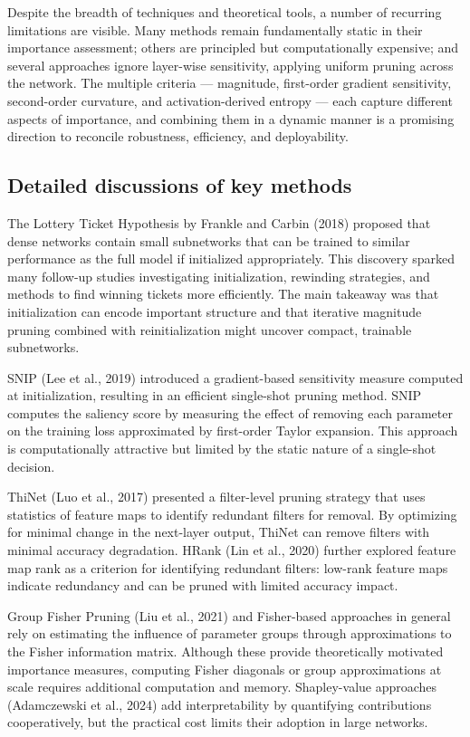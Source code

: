 \documentclass[12pt,a4paper]{report}
\begin{document}
Despite the breadth of techniques and theoretical tools, a number of recurring limitations are visible. Many methods remain fundamentally static in their importance assessment; others are principled but computationally expensive; and several approaches ignore layer-wise sensitivity, applying uniform pruning across the network. The multiple criteria — magnitude, first-order gradient sensitivity, second-order curvature, and activation-derived entropy — each capture different aspects of importance, and combining them in a dynamic manner is a promising direction to reconcile robustness, efficiency, and deployability.

\subsection{Detailed discussions of key methods}
The Lottery Ticket Hypothesis by Frankle and Carbin (2018) proposed that dense networks contain small subnetworks that can be trained to similar performance as the full model if initialized appropriately. This discovery sparked many follow-up studies investigating initialization, rewinding strategies, and methods to find winning tickets more efficiently. The main takeaway was that initialization can encode important structure and that iterative magnitude pruning combined with reinitialization might uncover compact, trainable subnetworks.

SNIP (Lee et al., 2019) introduced a gradient-based sensitivity measure computed at initialization, resulting in an efficient single-shot pruning method. SNIP computes the saliency score by measuring the effect of removing each parameter on the training loss approximated by first-order Taylor expansion. This approach is computationally attractive but limited by the static nature of a single-shot decision.

ThiNet (Luo et al., 2017) presented a filter-level pruning strategy that uses statistics of feature maps to identify redundant filters for removal. By optimizing for minimal change in the next-layer output, ThiNet can remove filters with minimal accuracy degradation. HRank (Lin et al., 2020) further explored feature map rank as a criterion for identifying redundant filters: low-rank feature maps indicate redundancy and can be pruned with limited accuracy impact.

Group Fisher Pruning (Liu et al., 2021) and Fisher-based approaches in general rely on estimating the influence of parameter groups through approximations to the Fisher information matrix. Although these provide theoretically motivated importance measures, computing Fisher diagonals or group approximations at scale requires additional computation and memory. Shapley-value approaches (Adamczewski et al., 2024) add interpretability by quantifying contributions cooperatively, but the practical cost limits their adoption in large networks.
\end{document}

